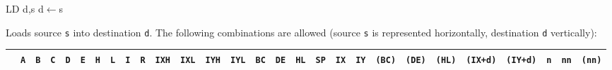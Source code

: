 \documentclass[12pt,twoside,openright,a4paper]{book}
\begin{document}
\begin{basedescript}{
	\desclabelstyle{\multilinelabel}
	\desclabelwidth{3cm}}
	\pagebreak
	\begin{detailitem}{LD d,s}
		{d$\leftarrow$s}

		Loads source {\tt s} into destination {\tt d}. The following combinations are allowed (source {\tt s} is represented horizontally, destination {\tt d} vertically):

		{
			\scriptsize
			\setlength{\tabcolsep}{1pt}
			\newcommand{\X}{$\bullet$}
			\newcommand{\n}{\cellcolor{llgray}}

			\begin{tabular}{@{}|c|c|c|c|c|c|c|c|c|c|c|c|c|c|c|c|c|c|c|c|c|c|c|c|c|c|c|c|}
				\arrayrulecolor{lightgray}
				\hline
				& {\tt A} & {\tt B} & {\tt C} & {\tt D} & {\tt E} & {\tt H} & {\tt L} & {\tt I} & {\tt R} & {\tt IXH} & {\tt IXL} & {\tt IYH} & {\tt IYL} & {\tt BC} & {\tt DE} & {\tt HL} & {\tt SP} & {\tt IX} & {\tt IY} & {\tt (BC)} & {\tt (DE)} & {\tt (HL)} & {\tt (IX+d)} & {\tt (IY+d)} & {\tt n} & {\tt nn} & {\tt (nn)} \\
				\hline


\end{tabular}}
\end{detailitem}
\end{basedescript}
\end{document}

